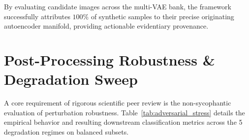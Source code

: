 \documentclass[11pt]{article}
\theoremstyle{definition}
\begin{document}
\begin{table}[t]
\caption{Fine-Grained Latent Architecture Provenance Attribution ($N=1,000$).}
\label{tab:attribution}
\centering
\small
{}
\end{table}

By evaluating candidate images across the multi-VAE bank, the framework successfully attributes $100\%$ of synthetic samples to their precise originating autoencoder manifold, providing actionable evidentiary provenance.

\section{Post-Processing Robustness \& Degradation Sweep}
\label{sec:adversarial}

A core requirement of rigorous scientific peer review is the non-sycophantic evaluation of perturbation robustness. Table~\ref{tab:adversarial_stress} details the empirical behavior and resulting downstream classification metrics across the 5 degradation regimes on balanced subsets.
\end{document}
